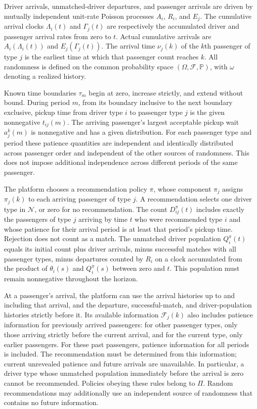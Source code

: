 \documentclass[10pt]{article}
\begin{document}
Driver arrivals, unmatched-driver departures, and passenger arrivals are driven by mutually independent unit-rate Poisson processes $A_i$, $R_i$, and $E_j$. The cumulative arrival clocks $\Lambda_i(t)$ and $\Gamma_j(t)$ are respectively the accumulated driver and passenger arrival rates from zero to $t$. Actual cumulative arrivals are $A_i(\Lambda_i(t))$ and $E_j(\Gamma_j(t))$. The arrival time $\nu_j(k)$ of the $k$th passenger of type $j$ is the earliest time at which that passenger count reaches $k$. All randomness is defined on the common probability space $(\Omega,\mathcal F,\mathbb P)$, with $\omega$ denoting a realized history.

Known time boundaries $\tau_m$ begin at zero, increase strictly, and extend without bound. During period $m$, from its boundary inclusive to the next boundary exclusive, pickup time from driver type $i$ to passenger type $j$ is the given nonnegative $t_{ij}(m)$. The arriving passenger's largest acceptable pickup wait $a_j^k(m)$ is nonnegative and has a given distribution. For each passenger type and period these patience quantities are independent and identically distributed across passenger order and independent of the other sources of randomness. This does not impose additional independence across different periods of the same passenger.

The platform chooses a recommendation policy $\pi$, whose component $\pi_j$ assigns $\pi_j(k)$ to each arriving passenger of type $j$. A recommendation selects one driver type in $\mathcal N$, or zero for no recommendation. The count $D_{ij}^\pi(t)$ includes exactly the passengers of type $j$ arriving by time $t$ who were recommended type $i$ and whose patience for their arrival period is at least that period's pickup time. Rejection does not count as a match. The unmatched driver population $Q_i^\pi(t)$ equals its initial count plus driver arrivals, minus successful matches with all passenger types, minus departures counted by $R_i$ on a clock accumulated from the product of $\theta_i(s)$ and $Q_i^\pi(s)$ between zero and $t$. This population must remain nonnegative throughout the horizon.

At a passenger's arrival, the platform can use the arrival histories up to and including that arrival, and the departure, successful-match, and driver-population histories strictly before it. Its available information $\mathcal F_j(k)$ also includes patience information for previously arrived passengers: for other passenger types, only those arriving strictly before the current arrival, and for the current type, only earlier passengers. For these past passengers, patience information for all periods is included. The recommendation must be determined from this information; current unrevealed patience and future arrivals are unavailable. In particular, a driver type whose unmatched population immediately before the arrival is zero cannot be recommended. Policies obeying these rules belong to $\Pi$. Random recommendations may additionally use an independent source of randomness that contains no future information.
\end{document}
